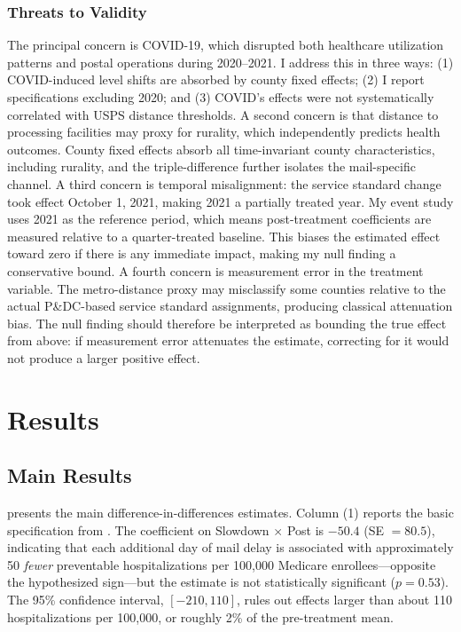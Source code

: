 \documentclass[12pt]{article}
\begin{document}
\subsubsection*{Threats to Validity} The principal concern is COVID-19, which disrupted both healthcare utilization patterns and postal operations during 2020--2021. I address this in three ways: (1) COVID-induced level shifts are absorbed by county fixed effects; (2) I report specifications excluding 2020; and (3) COVID's effects were not systematically correlated with USPS distance thresholds. A second concern is that distance to processing facilities may proxy for rurality, which independently predicts health outcomes. County fixed effects absorb all time-invariant county characteristics, including rurality, and the triple-difference further isolates the mail-specific channel. A third concern is temporal misalignment: the service standard change took effect October 1, 2021, making 2021 a partially treated year. My event study uses 2021 as the reference period, which means post-treatment coefficients are measured relative to a quarter-treated baseline. This biases the estimated effect toward zero if there is any immediate impact, making my null finding a conservative bound. A fourth concern is measurement error in the treatment variable. The metro-distance proxy may misclassify some counties relative to the actual P\&DC-based service standard assignments, producing classical attenuation bias. The null finding should therefore be interpreted as bounding the true effect from above: if measurement error attenuates the estimate, correcting for it would not produce a larger positive effect.

\section{Results}

\subsection{Main Results}

 presents the main difference-in-differences estimates. Column (1) reports the basic specification from . The coefficient on Slowdown $\times$ Post is $-50.4$ (SE $= 80.5$), indicating that each additional day of mail delay is associated with approximately 50 \textit{fewer} preventable hospitalizations per 100,000 Medicare enrollees---opposite the hypothesized sign---but the estimate is not statistically significant ($p = 0.53$). The 95\% confidence interval, $[-210, 110]$, rules out effects larger than about 110 hospitalizations per 100,000, or roughly 2\% of the pre-treatment mean.
\end{document}
